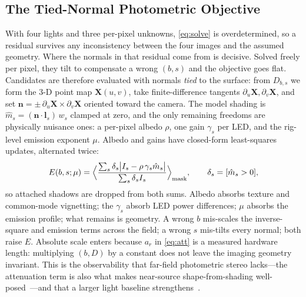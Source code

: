 \documentclass[conference]{IEEEtran}
\newcommand{\vn}{\bm{n}}
\newcommand{\vl}{\bm{l}}
\newcommand{\vX}{\bm{X}}
\begin{document}
\subsection{The Tied-Normal Photometric Objective}\label{sub:objective}
With four lights and three per-pixel unknowns, \eqref{eq:solve} is
overdetermined, so a residual survives any inconsistency between the four
images and the assumed geometry.  Where the normals in that residual come
from is decisive.  Solved freely per pixel, they tilt to compensate a
wrong $(b,s)$ and the objective goes flat.  Candidates are therefore
evaluated with normals \emph{tied} to the surface: from $D_{b,s}$ we form
the 3-D point map $\vX(u,v)$, take finite-difference tangents
$\partial_u\vX,\partial_v\vX$, and set
$\vn=\pm\,\partial_u\vX\times\partial_v\vX$ oriented toward the camera.
The model shading is $\hat m_s=(\vn\!\cdot\!\vl_s)\,w_s$ clamped at zero,
and the only remaining freedoms are physically nuisance ones: a per-pixel
albedo $\rho$, one gain $\gamma_s$ per LED, and the rig-level emission
exponent $\mu$.  Albedo and gains have closed-form least-squares updates,
alternated twice:
\begin{equation}
E(b,s;\mu)=\Bigl\langle
\frac{\sum_s \delta_s\bigl|I_s-\rho\,\gamma_s \hat m_s\bigr|}
     {\sum_s \delta_s I_s}\Bigr\rangle_{\text{mask}},\qquad
\delta_s=[\hat m_s>0],
\label{eq:objective}
\end{equation}
so attached shadows are dropped from both sums.  Albedo absorbs texture
and common-mode vignetting; the $\gamma_s$ absorb LED power differences;
$\mu$ absorbs the emission profile; what remains is geometry.  A wrong
$b$ mis-scales the inverse-square and emission terms across the field; a
wrong $s$ mis-tilts every normal; both raise $E$.  Absolute scale enters
because $a_r$ in \eqref{eq:att} is a measured hardware length:
multiplying $(b,D)$ by a constant does not leave the imaging geometry
invariant.  This is the observability that far-field photometric stereo
lacks---the attenuation term is also what makes near-source
shape-from-shading well-posed~\cite{prados2005}---and that a larger light
baseline strengthens~\cite{iranzo2025endometric}.
\end{document}

